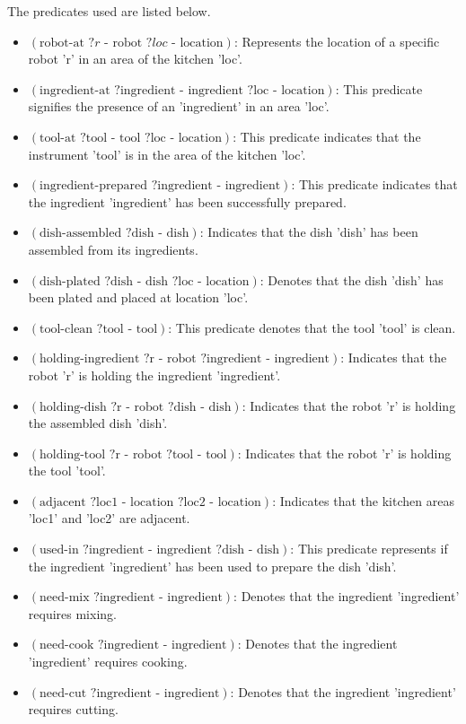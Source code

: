  The predicates used are listed below.
\begin{itemize}
  \item $ (\text{robot-at } ?r \text{ - robot } ?loc \text{ - location}) $: Represents the location of a specific robot 'r' in an area of the kitchen 'loc'.
  \item $ (\text{ingredient-at } ?\text{ingredient - ingredient } ?\text{loc - location}) $: This predicate signifies the presence of an 'ingredient' in an area 'loc'.
  \item $ (\text{tool-at } ?\text{tool - tool } ?\text{loc - location}) $: This predicate indicates that the instrument 'tool' is in the area of the kitchen 'loc'.
  \item $ (\text{ingredient-prepared } ?\text{ingredient - ingredient}) $: This predicate indicates that the ingredient 'ingredient' has been successfully prepared.
  \item $ (\text{dish-assembled } ?\text{dish - dish}) $: Indicates that the dish 'dish' has been assembled from its ingredients.
  \item $ (\text{dish-plated } ?\text{dish - dish } ?\text{loc - location}) $: Denotes that the dish 'dish' has been plated and placed at location 'loc'.
  \item $ (\text{tool-clean } ?\text{tool - tool}) $: This predicate denotes that the tool 'tool' is clean.
  \item $ (\text{holding-ingredient } ?\text{r - robot } ?\text{ingredient - ingredient}) $: Indicates that the robot 'r' is holding the ingredient 'ingredient'.
  \item $ (\text{holding-dish } ?\text{r - robot } ?\text{dish - dish}) $: Indicates that the robot 'r' is holding the assembled dish 'dish'.
  \item $ (\text{holding-tool } ?\text{r - robot } ?\text{tool - tool}) $: Indicates that the robot 'r' is holding the tool 'tool'.
  \item $ (\text{adjacent } ?\text{loc1 - location } ?\text{loc2 - location}) $: Indicates that the kitchen areas 'loc1' and 'loc2' are adjacent.
  \item $ (\text{used-in } ?\text{ingredient - ingredient } ?\text{dish - dish}) $: This predicate represents if the ingredient 'ingredient' has been used to prepare the dish 'dish'.
  \item $ (\text{need-mix } ?\text{ingredient - ingredient}) $: Denotes that the ingredient 'ingredient' requires mixing.
  \item $ (\text{need-cook } ?\text{ingredient - ingredient}) $: Denotes that the ingredient 'ingredient' requires cooking.
  \item $ (\text{need-cut } ?\text{ingredient - ingredient}) $: Denotes that the ingredient 'ingredient' requires cutting.
\end{itemize}
